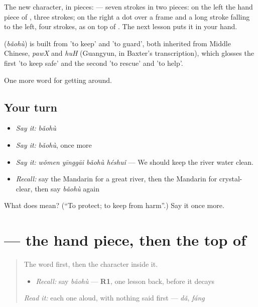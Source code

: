 The new character, in pieces:  — seven strokes in two pieces: on the left the hand piece of , three strokes; on the right a dot over a frame and a long stroke falling to the left, four strokes, as on top of . The next lesson puts it in your hand.

\begin{cousinweb}
\textbf{} (\emph{bǎohù}) is built from  'to keep' and  'to guard', both inherited from Middle Chinese, \emph{pawX} and \emph{huH} (Guangyun, in Baxter's transcription), which glosses the first 'to keep safe' and the second 'to rescue' and 'to help'.
\end{cousinweb}

\begin{grammarlens}[title={What you've built}]
One more word for getting around.
\end{grammarlens}

\subsection*{Your turn}
\begin{itemize}
\raggedright
  \item \emph{Say it:} \emph{bǎohù}
  \item \emph{Say it:} \emph{bǎohù}, once more
  \item \emph{Say it:} \emph{wǒmen yīnggāi bǎohù héshuǐ} — We should keep the river water clean.
  \item \emph{Recall:} say the Mandarin for a great river, then the Mandarin for crystal-clear, then say \emph{bǎohù} again
\end{itemize}

\begin{tcolorbox}[breakable,colback=teal!4,colframe=teal!35!black,title={Before you move on}]
What does  mean? (\textquotedblleft{}To protect; to keep from harm\textquotedblright{}.) Say it once more.
\end{tcolorbox}
\section[\texorpdfstring{\zh{护} (hù)}{护 (hù)}]{ — the hand piece, then the top of }

\label{lesson:ZH-W443-hu-guard}



\begin{quote}
The word first, then the character inside it.

\begin{itemize}
\raggedright
  \item \emph{Recall:} say \emph{bǎohù} — \textbf{R1}, one lesson back, before it decays
\end{itemize}

\begin{quote}
 
\end{quote}

\emph{Read it:} each one aloud, with nothing said first — \emph{dǎ}, \emph{fáng}
\end{quote}

